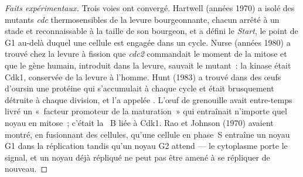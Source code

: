 \begin{proof}[Faits expérimentaux]
Trois voies ont convergé. Hartwell (années 1970) a isolé des mutants
\emph{cdc} thermosensibles de la levure bourgeonnante, chacun arrêté à
un stade et reconnaissable à la taille de son bourgeon, et a défini le
\emph{Start}, le point de G1 au-delà duquel une cellule est engagée
dans un cycle. Nurse (années 1980) a trouvé chez la levure à fission
que \emph{cdc2} commandait le moment de la mitose et que le gène
humain, introduit dans la levure, sauvait le mutant~: la kinase était
Cdk1, conservée de la levure à l'homme. Hunt (1983) a trouvé dans des
œufs d'oursin une protéine qui s'accumulait à chaque cycle et était
brusquement détruite à chaque division, et l'a appelée . L'œuf
de grenouille avait entre-temps livré un «~facteur promoteur de la
maturation~» qui entraînait n'importe quel noyau en mitose~; c'était la
~B liée à Cdk1. Rao et Johnson (1970) avaient montré, en
fusionnant des cellules, qu'une cellule en phase~S entraîne un noyau G1
dans la réplication tandis qu'un noyau G2 attend --- le cytoplasme
porte le signal, et un noyau déjà répliqué ne peut pas être amené à se
répliquer de nouveau.
\end{proof}

